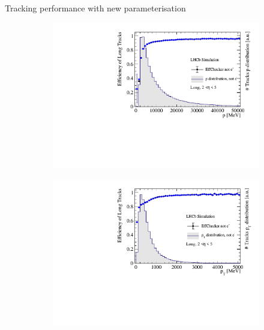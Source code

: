 \documentclass[xcolor={dvipsnames}]{beamer}
\begin{document}
\begin{frame}{Tracking performance with new parameterisation}
  \vspace{0.0cm}
  \begin{figure}[htb]
    \centering
    \begin{subfigure}{0.45\textwidth}
      \includegraphics[width=1\textwidth]{Plots/TrackEfficiency_p_improved_MC_parameterisation.pdf}
    \end{subfigure}%
    \begin{subfigure}{0.45\textwidth}
      \includegraphics[width=1\textwidth]{Plots/TrackEfficiency_pt_improved_MC_parameterisation.pdf}
    \end{subfigure}
    \begin{subfigure}{0.45\textwidth}

\end{subfigure}
\end{figure}
\end{frame}
\end{document}
